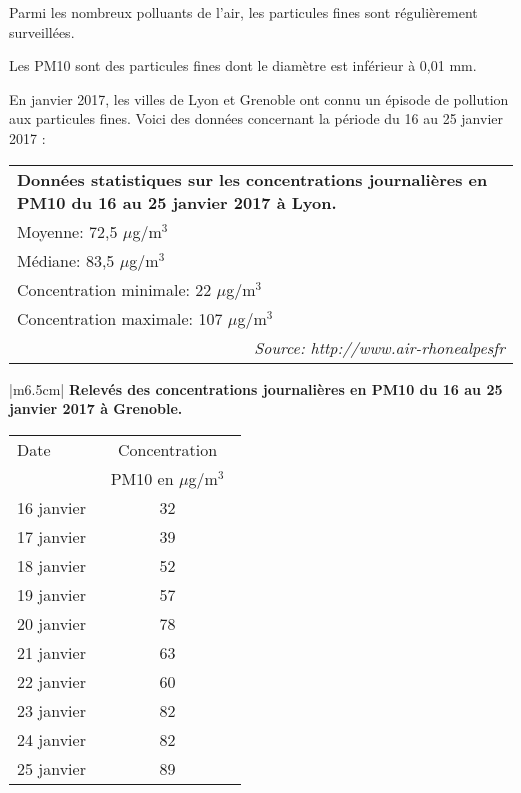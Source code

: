 
\medskip

Parmi les nombreux polluants de l'air, les particules fines sont régulièrement surveillées.

Les PM10 sont des particules fines dont le diamètre est inférieur à 0,01 mm.

En janvier 2017, les villes de Lyon et Grenoble ont connu un épisode de pollution aux particules fines. Voici des données concernant la période du 16 au 25 janvier 2017 :

\medskip

\begin{tabular}{|m{6.5cm}|}\hline
\textbf{Données statistiques sur les concentrations journalières en PM10 du
16 au 25 janvier 2017 à Lyon.}\\
\hspace{0.9cm} Moyenne: 72,5 $\mu$g/m$^3$\\
\hspace{0.9cm} Médiane: 83,5 $\mu$g/m$^3$\\
\hspace{0.9cm} Concentration minimale: 22 $\mu$g/m$^3$\\
\hspace{0.9cm} Concentration maximale: 107 $\mu$g/m$^3$\\ \hline
\multicolumn{1}{r}{\footnotesize \emph{Source: http://www.air-rhonealpesfr}}\\
\end{tabular}\hspace{0.5cm}
\begin{tabular}{|m{6.5cm}|}\hline
\textbf{Relevés des concentrations journalières en PM10 du 16 au 25 janvier 2017 à
Grenoble.}\\
\begin{tabular}{|l|c|}\hline
Date 		&~~Concentration~~\\ 
			&PM10 en $\mu$g/m$^3$\\ \hline
16 janvier 	&32\\ \hline
17 janvier 	&39\\ \hline
18 janvier 	&52\\ \hline
19 janvier 	&57\\ \hline
20 janvier 	&78\\ \hline
21 janvier 	&63\\ \hline
22 janvier 	&60\\ \hline
23 janvier 	&82\\ \hline
24 janvier 	&82\\ \hline
25 janvier 	&89\\ \hline
\end{tabular}\\ \hline
\end{tabular}

